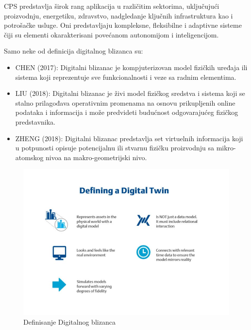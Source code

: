\documentclass[a4paper]{article}
\begin{document}
{CPS predstavlja širok rang aplikacija u različitim sektorima, uključujući proizvodnju, energetiku,
zdravstvo, nadgledanje ključnih infrastruktura kao i potrošačke usluge. Oni predstavljaju
kompleksne, fleksibilne i adaptivne sisteme čiji su elementi okarakterisani povećanom
autonomijom i inteligencijom.\cite{cyber}

\newpage

Samo neke od definicija digitalnog blizanca su:
\begin{itemize}
\item CHEN (2017): Digitalni blizanac je kompjuterizovan model fizičkih uređaja ili sistema koji reprezentuje sve funkcionalnosti i veze sa radnim elementima.\cite{enablingtechnologies}
\item LIU (2018): Digitalni blizanac je živi model fizičkog sredstva i sistema koji se stalno prilagođava operativnim promenama na osnovu prikupljenih online podataka i
informacija i može predvideti budućnost odgovarajućeg fizičkog predstavnika.\cite{enablingtechnologies}
\item ZHENG (2018): Digitalni blizanac predstavlja set virtuelnih informacija koji u potpunosti opisuje potencijalnu ili stvarnu fizičku proizvodnju sa mikro-atomskog nivoa na makro-geometrijski nivo.\cite{enablingtechnologies}
\end{itemize} 

\begin{figure}[h!]
	\begin{center}
		\includegraphics[scale=0.33]{2_definition_of_digital_twin.jpg}
	\end{center}
	\caption{Definisanje Digitalnog blizanca \cite{understanding}}
\end{figure}

}
\end{document}
